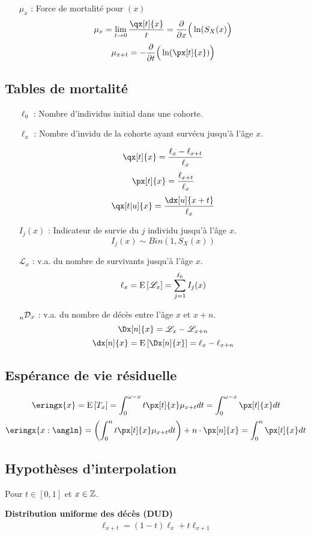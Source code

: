 \documentclass[10pt, french]{article}
\begin{document}
\begin{multicols*}{3}
\begin{itemize}
\item[$\mu_x$ : ] Force de mortalité pour $(x)$
\[\mu_x = \lim_{t \to 0} \frac{\qx[t]{x}}{t} = \derivee{x} \Big( \ln(S_X(x)\Big) \]
\[\mu_{x+t} = - \derivee{t} \Big( \ln ( \px[t]{x}) \Big) \]
\end{itemize}

\subsection{Tables de mortalité}
\begin{itemize}
\item[$\ell_0$ : ] Nombre d'individus initial dans une cohorte.
\item[$\ell_x$ : ] Nombre d'invidu de la cohorte ayant survécu jusqu'à l'âge $x$.

\[\qx[t]{x} = \frac{\ell_x - \ell_{x+t}}{\ell_x}\]
\[\px[t]{x} = \frac{\ell_{x+t}}{\ell_x} \]
\[\qx[t|u]{x} = \frac{\dx[u]{x+t}}{\ell_x}\]

\item[$I_j(x)$ : ] Indicateur de survie du $j$ individu jusqu'à l'âge $x$.
\[I_j(x) \sim Bin(1, S_X(x))\]
\item[$\mathscr{L}_x$ : ] v.a. du nombre de survivants jusqu'à l'âge $x$.
\[\ell_x = \mathrm{E} \left[ \mathscr{L}_x \right] = \sum_{j=1}^{\ell_0} I_j(x)\]

\item[$\prescript{}{n}{\mathcal{D}}_x$ : ] v.a. du nombre de décès entre l'âge $x$ et $x+n$.
\[\Dx[n]{x} = \mathscr{L}_x - \mathscr{L}_{x+n}\]
\[\dx[n]{x} = \esp{\Dx[n]{x}} = \ell_{x} - \ell_{x+n} \]
\end{itemize}
\subsection{Espérance de vie résiduelle}
\[\eringx{x} = \esp{T_x} =  \int_{0}^{\omega - x} t \px[t]{x} \mu_{x+t} dt= \int_{0}^{\omega - x} \px[t]{x} dt \]
\[\eringx{x:\angln} = \left( \int_{0}^{n} t \px[t]{x} \mu_{x+t} dt   \right) + n \cdot \px[n]{x} = \int_{0}^{n} \px[t]{x} dt \]


\subsection{Hypothèses d'interpolation}
Pour $t \in [0,1]$ et $x \in \mathbb{Z}$.

\textbf{Distribution uniforme des décès (DUD)}
\begin{align*}
\ell_{x+t} = (1-t) \ell_x + t \ell_{x+1}
\end{align*}


\end{multicols*}
\end{document}
